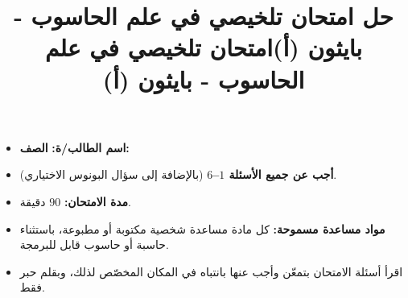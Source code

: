 \documentclass[14pt]{extarticle}
\title{حل امتحان تلخيصي في علم الحاسوب - بايثون (أ)}
\title{امتحان تلخيصي في علم الحاسوب - بايثون (أ)}
\begin{document}
\maketitle
\thispagestyle{fancy}

\ifwithsols
\else
\begin{boxCode}
\begin{itemize}[nosep]
    \item \textbf{اسم الطالب/ة:} \underline{\hspace{5cm}} \quad \textbf{الصف:} \underline{\hspace{3cm}}
    \item \textbf{أجب عن جميع الأسئلة $1$–$6$} (بالإضافة إلى سؤال البونوس الاختياري).
    \item \textbf{مدة الامتحان:} $90$ دقيقة.
    \item \textbf{مواد مساعدة مسموحة:} كل مادة مساعدة شخصية مكتوبة أو مطبوعة، باستثناء حاسبة أو حاسوب قابل للبرمجة.
    \item اقرأ أسئلة الامتحان بتمعّن وأجب عنها بانتباه في المكان المخصّص لذلك، وبقلم حبر فقط.
\end{itemize}
\end{boxCode}
\fi

\vspace{0.5cm}
\end{document}
